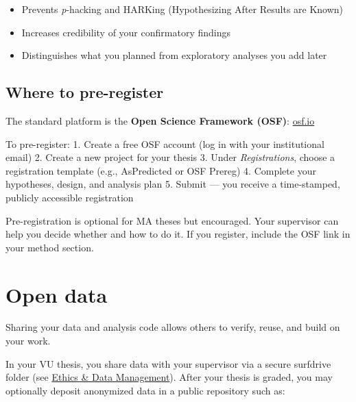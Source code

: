 \documentclass[
  11pt,
  a4paper,
]{scrbook}
\providecommand{\tightlist}{%
  \setlength{\itemsep}{0pt}\setlength{\parskip}{0pt}}\usepackage{longtable,booktabs,array}
\begin{document}
\begin{itemize}
\tightlist
\item
  Prevents \emph{p}-hacking and HARKing (Hypothesizing After Results are
  Known)
\item
  Increases credibility of your confirmatory findings
\item
  Distinguishes what you planned from exploratory analyses you add later
\end{itemize}

\subsection{Where to pre-register}\label{where-to-pre-register}

The standard platform is the \textbf{Open Science Framework (OSF)}:
\href{https://osf.io}{osf.io}

To pre-register: 1. Create a free OSF account (log in with your
institutional email) 2. Create a new project for your thesis 3. Under
\emph{Registrations}, choose a registration template (e.g., AsPredicted
or OSF Prereg) 4. Complete your hypotheses, design, and analysis plan 5.
Submit --- you receive a time-stamped, publicly accessible registration

\begin{tcolorbox}[enhanced jigsaw, bottomrule=.15mm, opacityback=0, toprule=.15mm, colframe=quarto-callout-tip-color-frame, left=2mm, rightrule=.15mm, title=\textcolor{quarto-callout-tip-color}{\faLightbulb}\hspace{0.5em}{Discuss pre-registration with your supervisor}, colbacktitle=quarto-callout-tip-color!10!white, bottomtitle=1mm, colback=white, breakable, toptitle=1mm, titlerule=0mm, leftrule=.75mm, arc=.35mm, opacitybacktitle=0.6, coltitle=black]

Pre-registration is optional for MA theses but encouraged. Your
supervisor can help you decide whether and how to do it. If you
register, include the OSF link in your method section.

\end{tcolorbox}

\section{Open data}\label{open-data}

Sharing your data and analysis code allows others to verify, reuse, and
build on your work.

In your VU thesis, you share data with your supervisor via a secure
surfdrive folder (see \href{ethics.qmd}{Ethics \& Data Management}).
After your thesis is graded, you may optionally deposit anonymized data
in a public repository such as:
\end{document}
